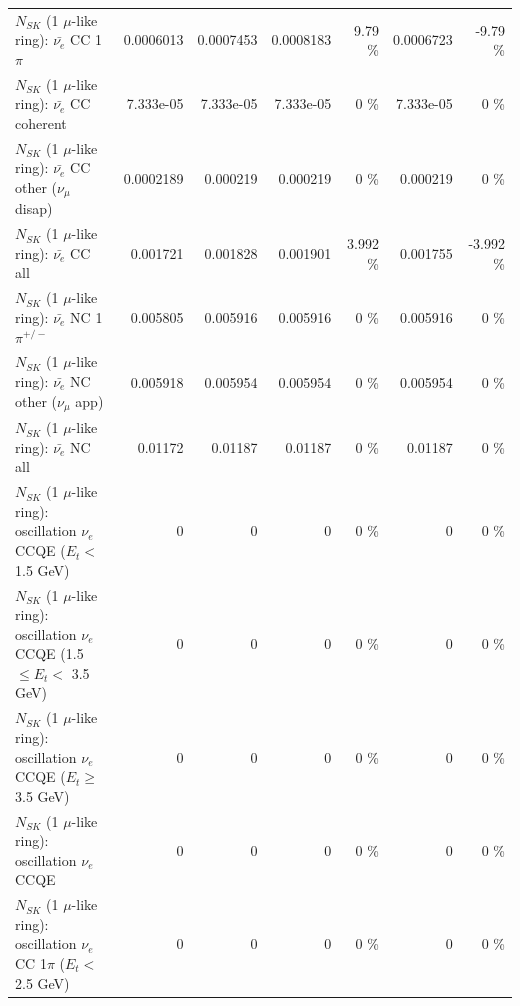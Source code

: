 \begin{table}
\begin{tabular}{| l | r | r | r  r | r  r |}
\hline
                           $N_{SK}$ (1 $\mu$-like ring): $\bar{\nu_e}$ CC 1$\pi$ &       0.0006013 &       0.0007453 &       0.0008183 &     9.79 \%  &       0.0006723 &    -9.79 \%  \\ 
                         $N_{SK}$ (1 $\mu$-like ring): $\bar{\nu_e}$ CC coherent &       7.333e-05 &       7.333e-05 &       7.333e-05 &        0 \%  &       7.333e-05 &        0 \%  \\ 
          $N_{SK}$ (1 $\mu$-like ring): $\bar{\nu_e}$ CC other ($\nu_\mu$ disap) &       0.0002189 &        0.000219 &        0.000219 &        0 \%  &        0.000219 &        0 \%  \\ 
                            $N_{SK}$ (1 $\mu$-like ring): $\bar{\nu_{e}}$ CC all &        0.001721 &        0.001828 &        0.001901 &    3.992 \%  &        0.001755 &   -3.992 \%  \\ 
\hline
                     $N_{SK}$ (1 $\mu$-like ring): $\bar{\nu_e}$ NC 1$\pi^{+/-}$ &        0.005805 &        0.005916 &        0.005916 &        0 \%  &        0.005916 &        0 \%  \\ 
            $N_{SK}$ (1 $\mu$-like ring): $\bar{\nu_e}$ NC other ($\nu_\mu$ app) &        0.005918 &        0.005954 &        0.005954 &        0 \%  &        0.005954 &        0 \%  \\ 
                            $N_{SK}$ (1 $\mu$-like ring): $\bar{\nu_{e}}$ NC all &         0.01172 &         0.01187 &         0.01187 &        0 \%  &         0.01187 &        0 \%  \\ 
\hline
\hline
\hline
      $N_{SK}$ (1 $\mu$-like ring): oscillation $\nu_e$ CCQE ($E_{t} <$ 1.5 GeV) &               0 &               0 &               0 &        0 \%  &               0 &        0 \%  \\ 
$N_{SK}$ (1 $\mu$-like ring): oscillation $\nu_e$ CCQE (1.5 $\leq E_{t} <$ 3.5 GeV) &               0 &               0 &               0 &        0 \%  &               0 &        0 \%  \\ 
   $N_{SK}$ (1 $\mu$-like ring): oscillation $\nu_e$ CCQE ($E_{t} \geq$ 3.5 GeV) &               0 &               0 &               0 &        0 \%  &               0 &        0 \%  \\ 
\hline
                          $N_{SK}$ (1 $\mu$-like ring): oscillation $\nu_e$ CCQE &               0 &               0 &               0 &        0 \%  &               0 &        0 \%  \\ 
\hline
 $N_{SK}$ (1 $\mu$-like ring): oscillation $\nu_e$ CC 1$\pi$ ($E_{t} <$ 2.5 GeV) &               0 &               0 &               0 &        0 \%  &               0 &        0 \%  \\ 

\end{tabular}
\end{table}
